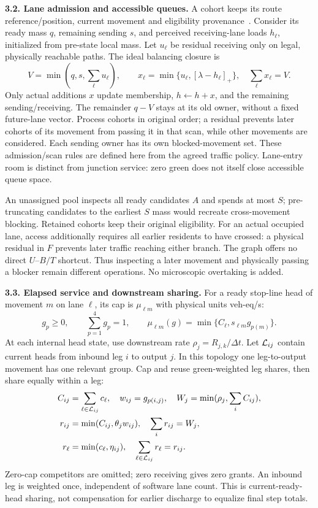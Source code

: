 \documentclass[10pt,a4paper]{article}
\begin{document}
\textbf{3.2. Lane admission and accessible queues.}
A cohort keeps its route reference/position, current movement and
eligibility provenance~\cite{m1}. Consider its ready mass $q$, remaining
sending $s$, and perceived receiving-lane loads $h_\ell$, initialized
from pre-state local mass. Let $u_\ell$ be residual receiving only on
legal, physically reachable paths. The ideal balancing closure is
\begin{equation}
 V=\min(q,s,\sum_\ell u_\ell),\qquad
 x_\ell=\min\{u_\ell,[\lambda-h_\ell]_+\},\quad
 \sum_\ell x_\ell=V .
 \label{eq:compact-allocation}
\end{equation}
Only actual additions $x$ update membership, $h\leftarrow h+x$, and the
remaining sending/receiving. The remainder $q-V$ stays at its old owner,
without a fixed future-lane vector. Process cohorts in original order;
a residual prevents later cohorts of its movement from passing it in
that scan, while other movements are considered. Each sending owner has
its own blocked-movement set. These admission/scan rules are defined here
from the agreed traffic policy. Lane-entry room is distinct from junction
service: zero green does not itself close accessible queue space.

An unassigned pool inspects all ready candidates $A$ and spends at most
$S$; pre-truncating candidates to the earliest $S$ mass would recreate
cross-movement blocking. Retained cohorts keep their original eligibility.
For an actual occupied lane, access additionally requires all earlier
residents to have crossed: a physical residual in $F$ prevents later
traffic reaching either branch. The graph offers no direct $U$--$B/T$
shortcut. Thus inspecting a later movement and physically passing a
blocker remain different operations. No microscopic overtaking is added.

\textbf{3.3. Elapsed service and downstream sharing.}
For a ready stop-line head of movement $m$ on lane $\ell$, its cap is
$\mu_{\ell m}$ with physical units veh-eq/s:
\begin{equation}
 g_p\geq0,\qquad \sum_{p=1}^4g_p=1,\qquad
 \mu_{\ell m}(g)=\min\{C_\ell,s_{\ell m}g_{p(m)}\}.
 \label{eq:compact-action}
\end{equation}
At each internal head state, use downstream rate
$\rho_j=R_{j,k}/\Delta t$.
Let ${\cal L}_{ij}$ contain current heads from inbound leg $i$ to output
$j$. In this topology one leg-to-output movement has one relevant group.
Cap and reuse green-weighted leg shares, then share equally within a leg:
\begin{align}
 C_{ij}&=\sum_{\ell\in{\cal L}_{ij}}c_\ell,\quad
 w_{ij}=g_{p(i,j)},\quad W_j=\min(\rho_j,\sum_iC_{ij}),\nonumber\\
 r_{ij}&=\min(C_{ij},\theta_jw_{ij}),\quad
                    \sum_i r_{ij}=W_j,\label{eq:compact-leg-sharing}\\
 r_\ell&=\min(c_\ell,\eta_{ij}),\quad
                    \sum_{\ell\in{\cal L}_{ij}}r_\ell=r_{ij}.
 \label{eq:compact-lane-sharing}
\end{align}
Zero-cap competitors are omitted; zero receiving gives zero grants.
An inbound leg is weighted once, independent of software lane count.
This is current-ready-head sharing, not compensation for earlier
discharge to equalize final step totals.
\end{document}
